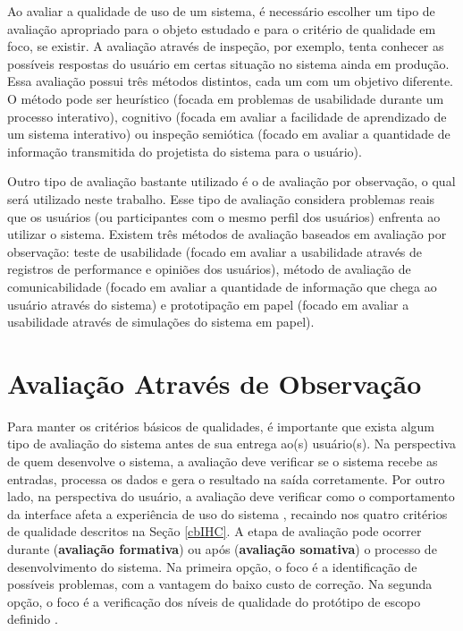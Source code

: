 \indent Ao avaliar a qualidade de uso de um sistema, é necessário escolher um tipo de avaliação apropriado para o objeto estudado e para o critério de qualidade em foco, se existir. A avaliação através de inspeção, por exemplo, tenta conhecer as possíveis respostas do usuário em certas situação no sistema ainda em produção. Essa avaliação possui três métodos distintos, cada um com um objetivo diferente. O método pode ser heurístico (focada em problemas de usabilidade durante um processo interativo), cognitivo (focada em avaliar a facilidade de aprendizado de um sistema interativo) ou inspeção semiótica (focado em avaliar a quantidade de informação transmitida do projetista do sistema para o usuário).

\indent Outro tipo de avaliação bastante utilizado é o de avaliação por observação, o qual será utilizado neste trabalho. Esse tipo de avaliação considera problemas reais que os usuários (ou participantes com o mesmo perfil dos usuários) enfrenta ao utilizar o sistema. Existem três métodos de avaliação baseados em avaliação por observação: teste de usabilidade (focado em avaliar a usabilidade através de registros de performance e opiniões dos usuários), método de avaliação de comunicabilidade (focado em avaliar a quantidade de informação que chega ao usuário através do sistema) e prototipação em papel (focado em avaliar a usabilidade através de simulações do sistema em papel).  

\section{Avaliação Através de Observação} \label{avaObs}

\indent Para manter os critérios básicos de qualidades, é importante que exista algum tipo de avaliação do sistema antes de sua entrega ao(s) usuário(s). Na perspectiva de quem desenvolve o sistema, a avaliação deve verificar se o sistema recebe as entradas, processa os dados e gera o resultado na saída corretamente. Por outro lado, na perspectiva do usuário, a avaliação deve verificar como o comportamento da interface afeta a experiência de uso do sistema \cite{IHCbook}, recaindo nos quatro critérios de qualidade descritos na Seção \ref{cbIHC}. A etapa de avaliação pode ocorrer durante (\textbf{avaliação formativa}) ou após (\textbf{avaliação somativa}) o processo de desenvolvimento do sistema. Na primeira opção, o foco é a identificação de possíveis problemas, com a vantagem do baixo custo de correção. Na segunda opção, o foco é a verificação dos níveis de qualidade do protótipo de escopo definido \cite{IHCbook}.

